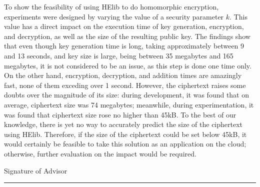 To show the feasibility of using HElib to do homomorphic encryption, experiments were designed by varying the value of a security parameter $k$. This value has a direct impact on the execution time of key generation, encryption, and decryption, as well as the size of the resulting public key. The findings show that even though key generation time is long, taking approximately between 9 and 13 seconds, and key size is large, being between 35 megabytes and 165 megabytes, it is not considered to be an issue, as this step is done one time only. On the other hand, encryption, decryption, and addition times are amazingly fast, none of them exceding over 1 second. However, the ciphertext raises some doubts over the magnitude of its size: during development, it was found that on average, ciphertext size was 74 megabytes; meanwhile, during experimentation, it was found that ciphertext size rose no higher than 45kB. To the best of our knowledge, there is yet no way to accurately predict the size of the ciphertext using HElib. Therefore, if the size of the ciphertext could be set below 45kB, it would certainly be feasible to take this solution as an application on the cloud; otherwise, further evaluation on the impact would be required.

\noindent Signature of Advisor \rule{72mm}{0.3pt}

\vspace*{-4mm}

\noindent \phantom{Advisor signature: m} \asesor
